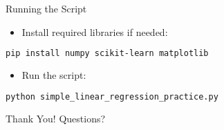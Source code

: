 \documentclass[aspectratio=169]{beamer}
\begin{document}
\begin{frame}[fragile]{Running the Script}
  \begin{itemize}
    \item Install required libraries if needed:
  \end{itemize}
  \begin{lstlisting}[language=bash]
pip install numpy scikit-learn matplotlib
  \end{lstlisting}
  \begin{itemize}
    \item Run the script:
  \end{itemize}
  \begin{lstlisting}[language=bash]
python simple_linear_regression_practice.py
  \end{lstlisting}
\end{frame}

\begin{frame}
  \centering
  \Huge Thank You!
  \vspace{1cm}
  \normalsize Questions?
\end{frame}
\end{document}
